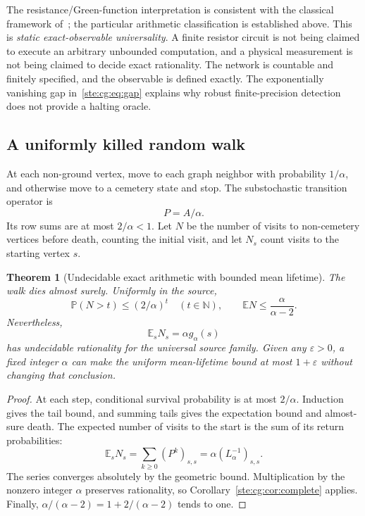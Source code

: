 \documentclass[11pt,letterpaper]{article}
\newtheorem{theorem}{Theorem}[section]
\theoremstyle{definition}
\theoremstyle{remark}
\newcommand{\N}{\mathbb N}
\newcommand{\E}{\mathbb E}
\newcommand{\Prob}{\mathbb P}
\begin{document}
The resistance/Green-function interpretation is consistent with the
classical framework of~\cite{doyle}; the particular arithmetic classification
is established above. This is \emph{static exact-observable universality}.
A finite resistor circuit is not being claimed to execute an arbitrary
unbounded computation, and a physical measurement is not being claimed to
decide exact rationality. The network is countable and finitely specified,
and the observable is defined exactly. The exponentially vanishing gap
in~\eqref{ste:cg:eq:gap} explains why robust finite-precision detection does not
provide a halting oracle.

\subsection{A uniformly killed random walk}
At each non-ground vertex, move to each graph neighbor with probability
$1/\alpha$, and otherwise move to a cemetery state and stop. The
substochastic transition operator is
\begin{equation}\label{ste:cg:eq:markov}
 P=A/\alpha.
\end{equation}
Its row sums are at most $2/\alpha<1$. Let $N$ be the number of visits to
non-cemetery vertices before death, counting the initial visit, and let
$N_s$ count visits to the starting vertex $s$.

\begin{theorem}[Undecidable exact arithmetic with bounded mean lifetime]
\label{ste:cg:thm:killed}
The walk dies almost surely. Uniformly in the source,
\begin{equation}\label{ste:cg:eq:lifetime}
 \Prob(N>t)\le(2/\alpha)^t\quad(t\in\N),\qquad
 \E N\le\frac\alpha{\alpha-2}.
\end{equation}
Nevertheless,
\begin{equation}\label{ste:cg:eq:returns}
 \E_s N_s=\alpha g_\alpha(s)
\end{equation}
has undecidable rationality for the universal source family. Given any
$\varepsilon>0$, a fixed integer $\alpha$ can make the uniform mean-lifetime
bound at most $1+\varepsilon$ without changing that conclusion.
\end{theorem}
\begin{proof}
At each step, conditional survival probability is at most $2/\alpha$.
Induction gives the tail bound, and summing tails gives the expectation
bound and almost-sure death. The expected number of visits to the start
is the sum of its return probabilities:
\[
 \E_s N_s=\sum_{k\ge0}(P^k)_{s,s}
 =\alpha(L_\alpha^{-1})_{s,s}.
\]
The series converges absolutely by the geometric bound. Multiplication
by the nonzero integer $\alpha$ preserves rationality, so
Corollary~\ref{ste:cg:cor:complete} applies. Finally,
$\alpha/(\alpha-2)=1+2/(\alpha-2)$ tends to one.
\end{proof}
\end{document}
